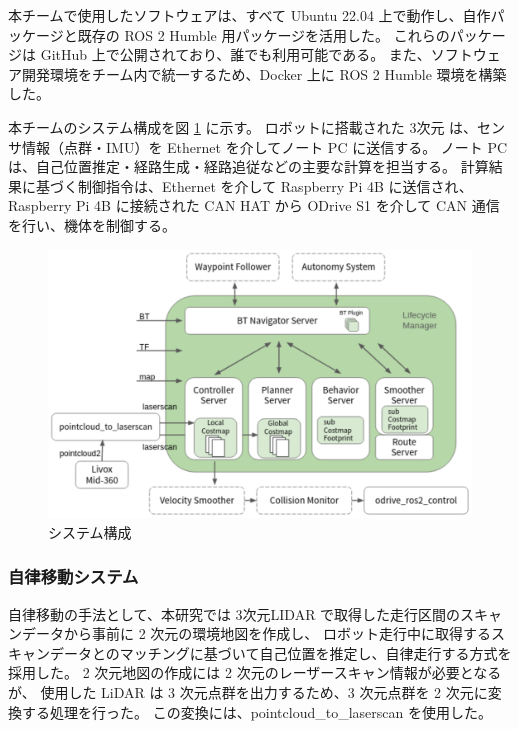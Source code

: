 \documentclass[twocolumn,9pt]{jsproceedings}
\begin{document}
本チームで使用したソフトウェアは、すべて Ubuntu 22.04 上で動作し、自作パッケージと既存の ROS 2 Humble 用パッケージを活用した。
これらのパッケージは GitHub 上で公開されており、誰でも利用可能である。
また、ソフトウェア開発環境をチーム内で統一するため、Docker 上に ROS 2 Humble 環境を構築した。

本チームのシステム構成を図 \ref{fig:shinsotu_system_diagram} に示す。
ロボットに搭載された 3次元 は、センサ情報（点群・IMU）を Ethernet を介してノート PC に送信する。
ノート PC は、自己位置推定・経路生成・経路追従などの主要な計算を担当する。
計算結果に基づく制御指令は、Ethernet を介して Raspberry Pi 4B に送信され、
Raspberry Pi 4B に接続された CAN HAT から ODrive S1 を介して CAN 通信を行い、機体を制御する。

\begin{figure}[h]
  \begin{center}
    \includegraphics[width=1.0\linewidth]{figs/shinsotu_system_diagram.pdf}
    \caption{システム構成 \cite{nav2_docs}}
    \label{fig:shinsotu_system_diagram}
  \end{center}
\end{figure}


\subsubsection{自律移動システム}

自律移動の手法として、本研究では 3次元LIDAR で取得した走行区間のスキャンデータから事前に 2 次元の環境地図を作成し、
ロボット走行中に取得するスキャンデータとのマッチングに基づいて自己位置を推定し、自律走行する方式を採用した。
2 次元地図の作成には 2 次元のレーザースキャン情報が必要となるが、
使用した LiDAR は 3 次元点群を出力するため、3 次元点群を 2 次元に変換する処理を行った。
この変換には、pointcloud\_to\_laserscan \cite{pcl_lsc} を使用した。
\end{document}

